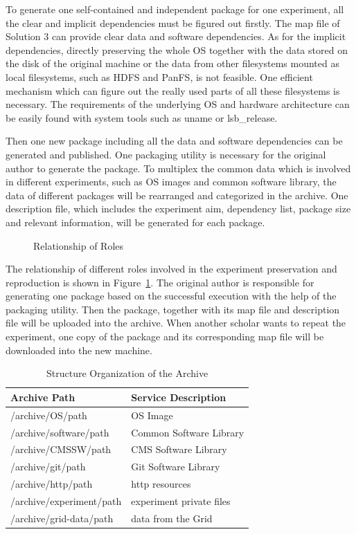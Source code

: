 \documentclass{acm_proc_article-sp}
\begin{document}
To generate one self-contained and independent package for one experiment, all
the clear and implicit dependencies must be figured out firstly. The map file
of Solution 3 can provide clear data and software dependencies. As for the
implicit dependencies, directly preserving the whole OS together with the data
stored on the disk of the original machine or the data from other filesystems
mounted as local filesystems, such as HDFS and PanFS,  is not feasible. One
efficient mechanism which can figure out the really used parts of all these
filesystems is necessary. The requirements of the underlying OS and hardware
architecture can be easily found with system tools such as uname or
lsb\_release.

Then one new package including all the data and software dependencies can be generated and published. 
One packaging utility is necessary for the original author to generate the package. 
To multiplex the common data which is involved in different experiments, such as OS images and common software library, the data of different packages will be rearranged and categorized in the archive.
One description file, which includes the experiment aim, dependency list,  package size and relevant information, will be generated for each package.

\begin{figure}
\centering
{}
\caption{Relationship of Roles}
\label{fig:solution3}
\end{figure}

The relationship of different roles involved in the experiment preservation and
reproduction is shown in Figure~\ref{fig:solution3}.  The original author is
responsible for generating one package based on the successful execution
with the help of the packaging utility. Then the package, together with
its map file and description file will be uploaded into the archive. When
another scholar wants to repeat the experiment, one copy of the package and its
corresponding map file will be downloaded into the new machine.

\begin{table}
    \centering
    \begin{tabular}{|l|l|}
        \hline
        Archive Path & Service Description \\ \hline
        /archive/OS/path & OS Image \\ \hline
        /archive/software/path & Common Software Library \\ \hline
        /archive/CMSSW/path & CMS Software Library \\ \hline
        /archive/git/path & Git Software Library \\ \hline
        /archive/http/path & http resources \\ \hline
        /archive/experiment/path & experiment private files \\ \hline
        /archive/grid-data/path & data from the Grid \\ \hline
    \end{tabular}
    \caption{Structure Organization of the Archive}
    \label{table:archive-map}
\end{table}
\end{document}
